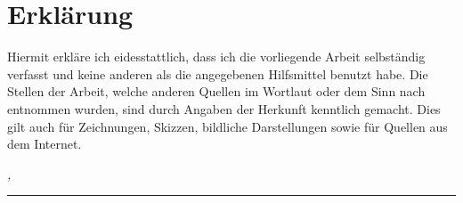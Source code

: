 %
\chapter*{Erklärung}
\label{sec:declaration}
\thispagestyle{empty}

Hiermit erkläre ich eidesstattlich, dass ich die vorliegende Arbeit selbständig verfasst und keine anderen als die angegebenen Hilfsmittel benutzt habe. Die Stellen der Arbeit, welche anderen Quellen im Wortlaut oder dem Sinn nach entnommen wurden, sind durch Angaben der Herkunft kenntlich gemacht. Dies gilt auch für Zeichnungen, Skizzen, bildliche Darstellungen sowie für Quellen aus dem Internet.

\bigskip

\noindent\textit{\thesisUniversityCity, \thesisDate}

\smallskip

\begin{flushright}
	\begin{minipage}{5cm}
		\rule{\textwidth}{1pt}
		\centering\thesisName
	\end{minipage}
\end{flushright}

\medskip

